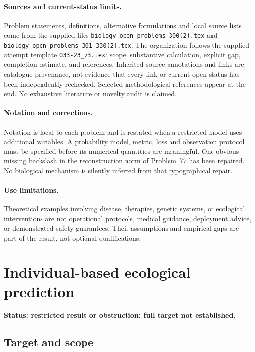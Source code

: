 \documentclass[11pt]{article}
\begin{document}
\paragraph{Sources and current-status limits.}
Problem statements, definitions, alternative formulations and local source lists
come from the supplied files
\texttt{biology\_open\_problems\_300(2).tex} and
\texttt{biology\_open\_problems\_301\_330(2).tex}.
The organization follows the supplied attempt template
\texttt{O33-23\_v3.tex}: scope, substantive calculation, explicit gap,
completion estimate, and references. Inherited source annotations and links are
catalogue provenance, not evidence that every link or current open status has
been independently rechecked. Selected methodological references appear at the
end. No exhaustive literature or novelty audit is claimed.

\paragraph{Notation and corrections.}
Notation is local to each problem and is restated when a restricted model uses
additional variables. A probability model, metric, loss and observation protocol
must be specified before its numerical quantities are meaningful. One obvious
missing backslash in the reconstruction norm of Problem~77 has been repaired.
No biological mechanism is silently inferred from that typographical repair.

\paragraph{Use limitations.}
Theoretical examples involving disease, therapies, genetic systems, or ecological
interventions are not operational protocols, medical guidance, deployment advice,
or demonstrated safety guarantees. Their assumptions and empirical gaps are part
of the result, not optional qualifications.


\section*{Individual-based ecological prediction}
\label{prob:188}
\noindent\textbf{Status: restricted result or obstruction; full target not established.}
\subsection{Target and scope}
\end{document}
